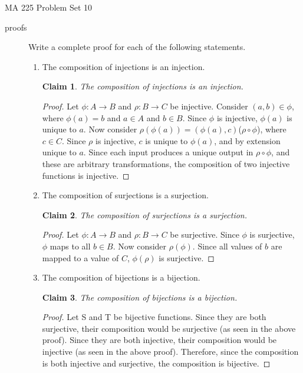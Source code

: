 \documentclass[11pt]{letter}
\newtheorem{claim}{Claim}
\theoremstyle{definition}
\begin{document}
\pagestyle{empty}

{\Large MA 225 Problem Set 10}\\


\begin{description}

	

\item[proofs] Write a complete proof for each of the following statements.
	\begin{enumerate}
        \item The composition of injections is an injection.
          \begin{claim}
            The composition of injections is an injection.
          \end{claim}
          \begin{proof}
  Let $\phi: A\rightarrow B$ and $\rho: B\rightarrow C$ be injective. Consider $(a,b)\in \phi$, where $\phi(a)=b$ and $a\in A$ and $b\in B$. Since $\phi$ is injective, $\phi(a)$ is unique to $a$. Now consider $\rho(\phi(a))=(\phi(a),c)$($\rho\circ\phi$), where $c\in C$. Since $\rho$ is injective, $c$ is unique to $\phi(a)$, and by extension unique to $a$. Since each input produces a unique output in $\rho\circ\phi$, and these are arbitrary transformations, the composition of two injective functions is injective.
\end{proof}


\item The composition of surjections is a surjection.
  \begin{claim}
    The composition of surjections is a surjection.
  \end{claim}
  \begin{proof}
    Let $\phi: A\rightarrow B$ and $\rho: B\rightarrow C$ be surjective. Since $\phi$ is surjective, $\phi$ maps to all $b\in B$. Now consider $\rho(\phi)$. Since all values of $b$ are mapped to a value of $C$, $\phi(\rho)$ is surjective.
  \end{proof}
  
\item The composition of bijections is a bijection.
  \begin{claim}
    The composition of bijections is a bijection.
  \end{claim}
  \begin{proof}
    Let S and T be bijective functions. Since they are both surjective, their composition would be surjective (as seen in the above proof). Since they are both injective, their composition would be injective (as seen in the above proof). Therefore, since the composition is both injective and surjective, the composition is bijective.
\end{proof}


\end{enumerate}
\end{description}
\end{document}
